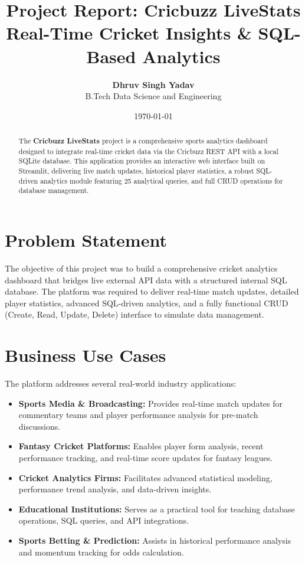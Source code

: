 \documentclass[11pt, a4paper]{article}
\title{\textbf{Project Report: Cricbuzz LiveStats} \\ \large Real-Time Cricket Insights \& SQL-Based Analytics}
\author{\textbf{Dhruv Singh Yadav} \\ B.Tech Data Science and Engineering}
\date{\today}
\begin{document}
	
	\maketitle
	
	\begin{abstract}
		The \textbf{Cricbuzz LiveStats} project is a comprehensive sports analytics dashboard designed to integrate real-time cricket data via the Cricbuzz REST API with a local SQLite database. This application provides an interactive web interface built on Streamlit, delivering live match updates, historical player statistics, a robust SQL-driven analytics module featuring 25 analytical queries, and full CRUD operations for database management.
	\end{abstract}
	
	\section{Problem Statement}
	The objective of this project was to build a comprehensive cricket analytics dashboard that bridges live external API data with a structured internal SQL database. The platform was required to deliver real-time match updates, detailed player statistics, advanced SQL-driven analytics, and a fully functional CRUD (Create, Read, Update, Delete) interface to simulate data management.
	
	\section{Business Use Cases}
	The platform addresses several real-world industry applications:
	\begin{itemize}
		\item \textbf{Sports Media \& Broadcasting:} Provides real-time match updates for commentary teams and player performance analysis for pre-match discussions.
		\item \textbf{Fantasy Cricket Platforms:} Enables player form analysis, recent performance tracking, and real-time score updates for fantasy leagues.
		\item \textbf{Cricket Analytics Firms:} Facilitates advanced statistical modeling, performance trend analysis, and data-driven insights.
		\item \textbf{Educational Institutions:} Serves as a practical tool for teaching database operations, SQL queries, and API integrations.
		\item \textbf{Sports Betting \& Prediction:} Assists in historical performance analysis and momentum tracking for odds calculation.
	\end{itemize}
	
\end{document}
